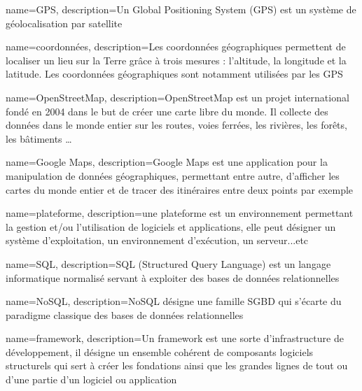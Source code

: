 \makeglossaries

 
{
    name=GPS,
    description={Un Global Positioning System (GPS) est un système de géolocalisation par satellite}
}

{
    name=coordonnées,
    description={Les coordonnées géographiques permettent de localiser un lieu sur la Terre grâce à trois mesures : l'altitude, la longitude et la latitude. Les coordonnées géographiques sont notamment utilisées par les GPS}
}

{
    name=OpenStreetMap,
    description={OpenStreetMap est un projet international fondé en 2004 dans le but de créer une carte libre du monde. Il collecte des données dans le monde entier sur les routes, voies ferrées, les rivières, les forêts, les bâtiments …}
}

{
    name=Google Maps,
    description={Google Maps est une application pour la manipulation de données géographiques, permettant entre autre, d'afficher les cartes du monde entier et de tracer des itinéraires entre deux points par exemple}
}

{
    name=plateforme,
    description={une plateforme est un environnement permettant la gestion et/ou l'utilisation de logiciels et applications, elle peut désigner un système d'exploitation, un environnement d'exécution, un serveur...etc}
}

{
    name=SQL,
    description={SQL (Structured Query Language) est un langage informatique normalisé servant à exploiter des bases de données relationnelles}
}

{
    name=NoSQL,
    description={NoSQL désigne une famille SGBD qui s'écarte du paradigme classique des bases de données relationnelles}
}

{
    name=framework,
    description={Un framework est une sorte d'infrastructure de développement, il désigne un ensemble cohérent de composants logiciels structurels qui sert à créer les fondations ainsi que les grandes lignes de tout ou d'une partie d'un logiciel ou application}
}

